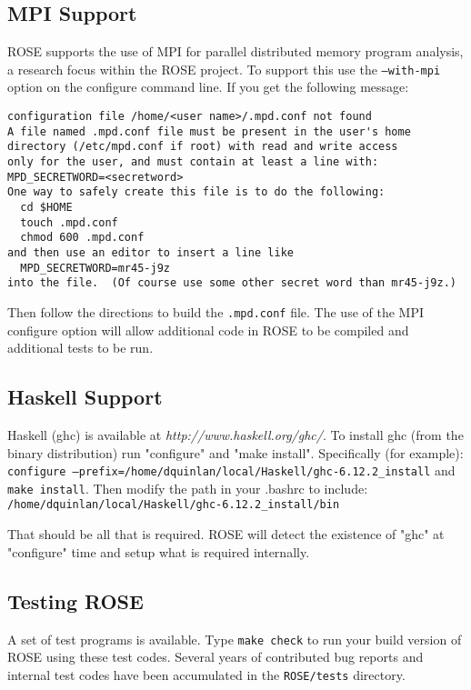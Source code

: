 
\subsection{MPI Support}
     ROSE supports the use of MPI for parallel distributed memory program analysis, a
research focus within the ROSE project.  To support this use the {\tt --with-mpi}
option on the configure command line.  If you get the following message:
\begin{verbatim}
configuration file /home/<user name>/.mpd.conf not found
A file named .mpd.conf file must be present in the user's home
directory (/etc/mpd.conf if root) with read and write access
only for the user, and must contain at least a line with:
MPD_SECRETWORD=<secretword>
One way to safely create this file is to do the following:
  cd $HOME
  touch .mpd.conf
  chmod 600 .mpd.conf
and then use an editor to insert a line like
  MPD_SECRETWORD=mr45-j9z
into the file.  (Of course use some other secret word than mr45-j9z.)
\end{verbatim}
Then follow the directions to build the {\tt .mpd.conf} file.  The use of the 
MPI configure option will allow additional code in ROSE to be compiled and 
additional tests to be run.

\subsection{Haskell Support}
   Haskell (ghc) is available at {\it http://www.haskell.org/ghc/}.
To install ghc (from the binary distribution) run "configure" and 
"make install". Specifically (for example): \\
{\tt configure --prefix=/home/dquinlan/local/Haskell/ghc-6.12.2\_install}
and
{\tt make install}.
Then modify the path in your .bashrc to include: \\
   {\tt /home/dquinlan/local/Haskell/ghc-6.12.2\_install/bin}

That should be all that is required.  ROSE will detect
the existence of "ghc" at "configure" time and setup
what is required internally.



\subsection{Testing ROSE}
     A set of test programs is available.  %
Type {\tt make check} to run your build version of ROSE using these test codes.  
Several years of contributed bug reports and internal test codes have been accumulated 
in the {\tt ROSE/tests} directory.


